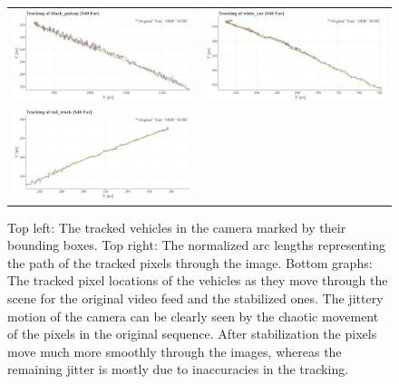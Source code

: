 \begin{figure}[!ht]
\begin{tabular}{cc}
    \includegraphics[width=0.475\linewidth]{diagrams/object_tracking/s40_n_far/black_pickup.png}    &  
    \includegraphics[width=0.475\linewidth]{diagrams/object_tracking/s40_n_far/white_car.png}    \\  
    \includegraphics[width=0.475\linewidth]{diagrams/object_tracking/s40_n_far/red_truck.png}   
  \end{tabular}
  \caption{Top left:
  The tracked vehicles in the camera  marked by their bounding boxes. 
  Top right: 
  The normalized arc lengths representing the path of the tracked pixels through the image.
  Bottom graphs:
  The tracked pixel locations of the vehicles as they move through the scene for the original video feed and the stabilized ones.
  The jittery motion of the camera can be clearly seen by the chaotic movement of the pixels in the original sequence.
  After stabilization the pixels move much more smoothly through the images, whereas the remaining jitter is mostly due to inaccuracies in the tracking. 
  }
  \label{fig:object_tracking_appendix_s40_n_far}
\end{figure}



